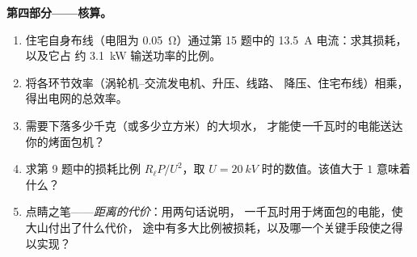 \begin{problem}
\medskip
\noindent\textbf{第四部分——核算。}
\begin{enumerate}[resume]
  \item 住宅自身布线（电阻为 \qty{0.05}{\ohm}）通过第 15 题中的
        \qty{13.5}{A} 电流：求其损耗，以及它占
        约 \qty{3.1}{kW} 输送功率的比例。
  \item 将各环节效率（涡轮机–交流发电机、升压、线路、
        降压、住宅布线）相乘，得出电网的总效率。
  \item 需要下落多少千克（或多少立方米）的大坝水，
        才能使\emph{一}千瓦时的电能送达你的烤面包机？
  \item 求第 9 题中的损耗比例 $R_\ell P/U^2$，取
        $U = \qty{20}{kV}$ 时的数值。该值大于 $1$ 意味着什么？
  \item 点睛之笔——\emph{距离的代价}：用两句话说明，
        一千瓦时用于烤面包的电能，使大山付出了什么代价，
        途中有多大比例被损耗，以及哪一个关键手段使之得以实现？
\end{enumerate}
\end{problem}

